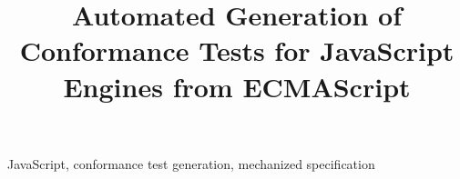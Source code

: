 \documentclass[10pt,conference]{IEEEtran}
\begin{document}
\title{Automated Generation of Conformance Tests for JavaScript Engines from ECMAScript}

\author{
}

% 
% 
% 
% 
% 
% 

\maketitle



\begin{IEEEkeywords}
JavaScript, conformance test generation, mechanized specification
\end{IEEEkeywords}












\end{document}
